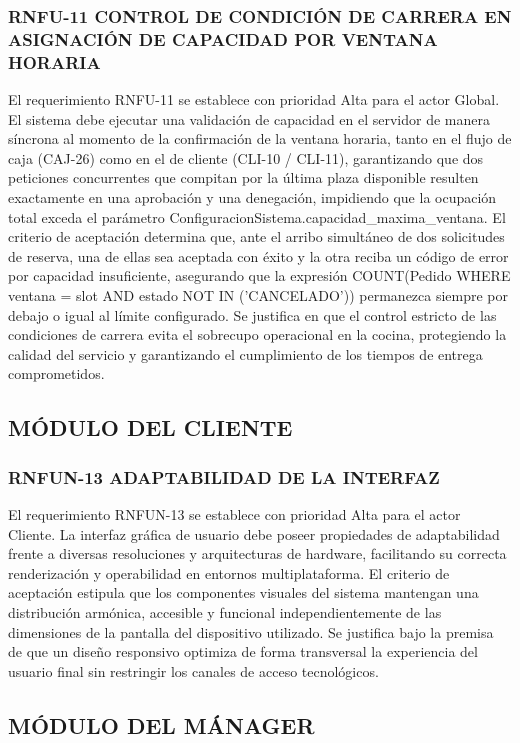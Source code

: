 \subsubsection{RNFU-11 CONTROL DE CONDICIÓN DE CARRERA EN ASIGNACIÓN DE CAPACIDAD POR VENTANA HORARIA}
El requerimiento RNFU-11 se establece con prioridad Alta para el actor Global. El sistema debe ejecutar una validación de capacidad en el servidor de manera síncrona al momento de la confirmación de la ventana horaria, tanto en el flujo de caja (CAJ-26) como en el de cliente (CLI-10 / CLI-11), garantizando que dos peticiones concurrentes que compitan por la última plaza disponible resulten exactamente en una aprobación y una denegación, impidiendo que la ocupación total exceda el parámetro ConfiguracionSistema.capacidad\_maxima\_ventana. El criterio de aceptación determina que, ante el arribo simultáneo de dos solicitudes de reserva, una de ellas sea aceptada con éxito y la otra reciba un código de error por capacidad insuficiente, asegurando que la expresión COUNT(Pedido WHERE ventana = slot AND estado NOT IN ('CANCELADO')) permanezca siempre por debajo o igual al límite configurado. Se justifica en que el control estricto de las condiciones de carrera evita el sobrecupo operacional en la cocina, protegiendo la calidad del servicio y garantizando el cumplimiento de los tiempos de entrega comprometidos.

\subsection{MÓDULO DEL CLIENTE}
\subsubsection{RNFUN-13 ADAPTABILIDAD DE LA INTERFAZ}
El requerimiento RNFUN-13 se establece con prioridad Alta para el actor Cliente. La interfaz gráfica de usuario debe poseer propiedades de adaptabilidad frente a diversas resoluciones y arquitecturas de hardware, facilitando su correcta renderización y operabilidad en entornos multiplataforma. El criterio de aceptación estipula que los componentes visuales del sistema mantengan una distribución armónica, accesible y funcional independientemente de las dimensiones de la pantalla del dispositivo utilizado. Se justifica bajo la premisa de que un diseño responsivo optimiza de forma transversal la experiencia del usuario final sin restringir los canales de acceso tecnológicos.

\subsection{MÓDULO DEL MÁNAGER}

